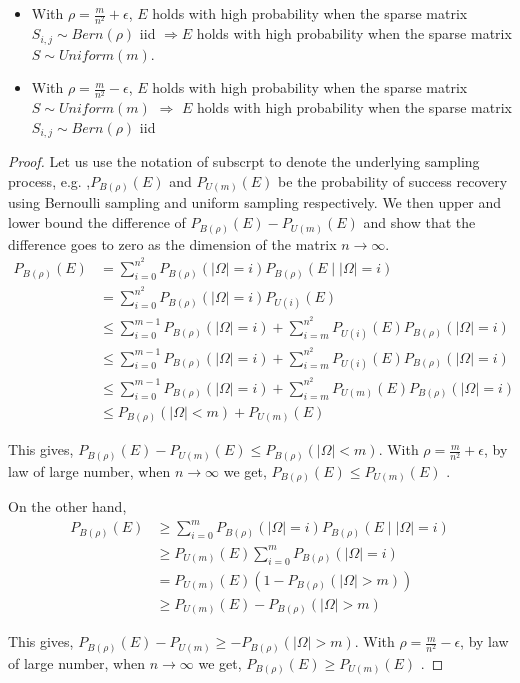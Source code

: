 \begin{itemize}
\item With $\rho=\frac{m}{n^{2}}+\epsilon$, $E$ holds with high probability when the sparse matrix $S_{i,j}\sim Bern(\rho)$ iid $\Longrightarrow$$E$ holds with high probability when the sparse matrix $S\sim Uniform(m)$.
\item With $\rho=\frac{m}{n^{2}}-\epsilon$, $E$ holds with high probability when the sparse matrix $S\sim Uniform(m)$ $\Longrightarrow$ $E$ holds with high probability when the sparse matrix $S_{i,j}\sim Bern(\rho)$
iid
\end{itemize}
\begin{proof}
Let us use the notation of subscrpt to denote the underlying sampling process, e.g. ,$P_{B(\rho)}(E)$ and $P_{U(m)}(E)$ be the probability of success recovery using Bernoulli sampling and uniform sampling respectively. We then upper and lower bound the difference of $P_{B(\rho)}(E)-P_{U(m)}(E)$ and show that the difference goes to zero as the dimension of the matrix $n\to\infty$. \\

\begin{align*}
P_{B(\rho)}(E)
& = \sum_{i=0}^{n^{2}}P_{B(\rho)}(|\Omega|=i)P_{B(\rho)}(E\mid|\Omega|=i)\\
& = \sum_{i=0}^{n^{2}}P_{B(\rho)}(|\Omega|=i)P_{U(i)}(E)\\
& \le \sum_{i=0}^{m-1}P_{B(\rho)}(|\Omega|=i)+\sum_{i=m}^{n^{2}}P_{U(i)}(E)P_{B(\rho)}(|\Omega|=i)\\
& \le \sum_{i=0}^{m-1}P_{B(\rho)}(|\Omega|=i)+\sum_{i=m}^{n^{2}}P_{U(i)}(E)P_{B(\rho)}(|\Omega|=i)\\
& \le \sum_{i=0}^{m-1}P_{B(\rho)}(|\Omega|=i)+\sum_{i=m}^{n^{2}}P_{U(m)}(E)P_{B(\rho)}(|\Omega|=i)\\
& \le P_{B(\rho)}(|\Omega|<m)+P_{U(m)}(E)
\end{align*}


This gives, $P_{B(\rho)}(E)-P_{U(m)}(E)\le P_{B(\rho)}(|\Omega|<m)$. With $\rho=\frac{m}{n^{2}}+\epsilon$, by law of large number, when $n\to\infty$ we get, $P_{B(\rho)}(E)\le P_{U(m)}(E)$ .

On the other hand,
\begin{align*}
P_{B(\rho)}(E)
& \ge \sum_{i=0}^{m}P_{B(\rho)}(|\Omega|=i)P_{B(\rho)}(E\mid|\Omega|=i)\\
& \ge P_{U(m)}(E)\sum_{i=0}^{m}P_{B(\rho)}(|\Omega|=i)\\
& = P_{U(m)}(E)(1-P_{B(\rho)}(|\Omega|>m))\\
& \ge P_{U(m)}(E)-P_{B(\rho)}(|\Omega|>m)
\end{align*}


This gives, $P_{B(\rho)}(E)-P_{U(m)}\ge-P_{B(\rho)}(|\Omega|>m)$. With $\rho=\frac{m}{n^{2}}-\epsilon$, by law of large number, when $n\to\infty$ we get, $P_{B(\rho)}(E)\ge P_{U(m)}(E)$ .
\end{proof}


